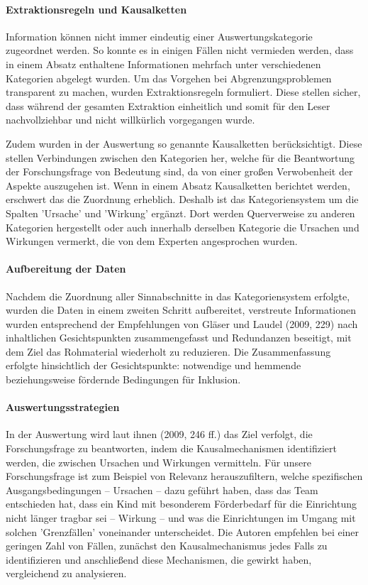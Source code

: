 \paragraph{Extraktionsregeln und Kausalketten} Information können nicht immer eindeutig einer Auswertungskategorie zugeordnet werden. So konnte es in einigen Fällen nicht vermieden werden, dass in einem Absatz enthaltene Informationen mehrfach unter verschiedenen Kategorien abgelegt wurden. Um das Vorgehen bei Abgrenzungsproblemen transparent zu machen, wurden Extraktionsregeln formuliert. Diese stellen sicher, dass während der gesamten Extraktion einheitlich und somit für den Leser nachvollziehbar und nicht willkürlich vorgegangen wurde. 

Zudem wurden in der Auswertung so genannte Kausalketten berücksichtigt. Diese stellen Verbindungen zwischen den Kategorien her, welche für die Beantwortung der Forschungsfrage von Bedeutung sind, da von einer großen Verwobenheit der Aspekte auszugehen ist. Wenn in einem Absatz Kausalketten berichtet werden, erschwert das die Zuordnung erheblich. Deshalb ist das Kategoriensystem um die Spalten 'Ursache' und 'Wirkung' ergänzt. Dort werden Querverweise zu anderen Kategorien hergestellt oder auch innerhalb derselben Kategorie die Ursachen und Wirkungen vermerkt, die von dem Experten angesprochen wurden.

\paragraph{Aufbereitung der Daten}
Nachdem die Zuordnung aller Sinnabschnitte in das Kategoriensystem erfolgte, wurden die Daten in einem zweiten Schritt aufbereitet, verstreute Informationen wurden entsprechend der Empfehlungen von Gläser und Laudel (2009, 229)  
nach inhaltlichen Gesichtspunkten zusammengefasst und Redundanzen beseitigt, mit dem Ziel das Rohmaterial wiederholt zu reduzieren.
Die Zusammenfassung erfolgte hinsichtlich der Gesichtspunkte: notwendige und hemmende beziehungsweise fördernde Bedingungen für Inklusion. 

\paragraph{Auswertungsstrategien}
In der Auswertung wird laut ihnen (2009, 246 ff.) das Ziel verfolgt, die Forschungsfrage zu beantworten, indem die Kausalmechanismen identifiziert werden, die zwischen Ursachen und Wirkungen vermitteln. Für unsere Forschungsfrage ist zum Beispiel von Relevanz herauszufiltern, welche spezifischen Ausgangsbedingungen -- Ursachen -- dazu geführt haben, dass das Team entschieden hat, dass ein Kind mit besonderem Förderbedarf für die Einrichtung nicht länger tragbar sei -- Wirkung -- und was die Einrichtungen im Umgang mit solchen 'Grenzfällen' voneinander unterscheidet.
Die Autoren empfehlen bei einer geringen Zahl von Fällen, zunächst den Kausalmechanismus jedes Falls zu identifizieren und anschließend diese Mechanismen, die gewirkt haben, vergleichend zu analysieren.

